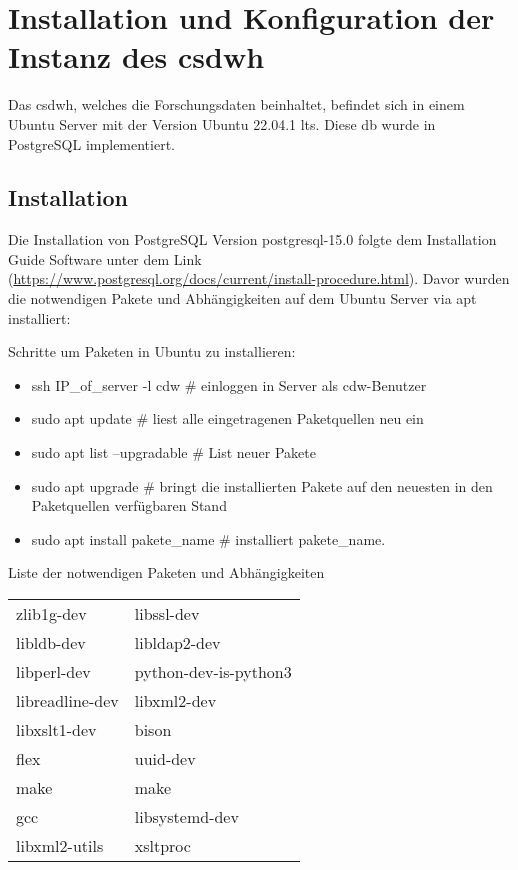 \chapter{Installation und Konfiguration der Instanz des \acs{csdwh}}
    
    Das \ac{csdwh}, welches die Forschungsdaten beinhaltet, befindet sich in einem Ubuntu Server mit der Version Ubuntu 22.04.1 \ac{lts}. Diese \ac{db} wurde in PostgreSQL  implementiert.
    
    \section{Installation}
    
    Die Installation von PostgreSQL Version postgresql-15.0 folgte dem Installation Guide Software unter dem Link  (\url{https://www.postgresql.org/docs/current/install-procedure.html}). Davor wurden die notwendigen Pakete und Abhängigkeiten auf dem Ubuntu Server via \textsf{apt} installiert:
    
    Schritte um Paketen in Ubuntu zu installieren:
    \begin{itemize}
    	\item ssh IP\_of\_server -l cdw \# einloggen in Server als cdw-Benutzer
    	\item sudo apt update \# liest alle eingetragenen Paketquellen neu ein
    	\item sudo apt list --upgradable \# List neuer Pakete
    	\item sudo apt upgrade \#  bringt die installierten Pakete auf den neuesten in den Paketquellen verfügbaren Stand
    	\item sudo apt install pakete\_name \# installiert pakete\_name.
    \end{itemize}
    
    Liste der notwendigen Paketen und Abhängigkeiten
    
    \begin{tabular}{ll}
    	\textsf{zlib1g-dev} & \textsf{libssl-dev} \\ 
    	\textsf{libldb-dev} & \textsf{libldap2-dev} \\
    	\textsf{libperl-dev} & \textsf{python-dev-is-python3} \\
    	\textsf{libreadline-dev} & \textsf{libxml2-dev} \\
    	\textsf{libxslt1-dev} & \textsf{bison} \\
    	\textsf{flex} & \textsf{uuid-dev} \\
    	\textsf{make} & \textsf{make} \\
    	\textsf{gcc} & \textsf{libsystemd-dev} \\
    	\textsf{libxml2-utils} & \textsf{xsltproc} \\
    \end{tabular} \\

